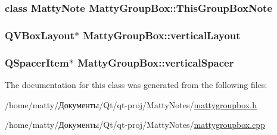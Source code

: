 \subsubsection[{\texorpdfstring{This\+Group\+Box\+Note}{ThisGroupBoxNote}}]{\setlength{\rightskip}{0pt plus 5cm}class {\bf Matty\+Note} Matty\+Group\+Box\+::\+This\+Group\+Box\+Note\hspace{0.3cm}{\ttfamily [private]}}\hypertarget{class_matty_group_box_a00ca2ef39a0b5aca9e83373777bed395}{}\label{class_matty_group_box_a00ca2ef39a0b5aca9e83373777bed395}
\subsubsection[{\texorpdfstring{vertical\+Layout}{verticalLayout}}]{\setlength{\rightskip}{0pt plus 5cm}Q\+V\+Box\+Layout$\ast$ Matty\+Group\+Box\+::vertical\+Layout\hspace{0.3cm}{\ttfamily [private]}}\hypertarget{class_matty_group_box_a2fc280283ef68a61828fe26007c949f1}{}\label{class_matty_group_box_a2fc280283ef68a61828fe26007c949f1}
\subsubsection[{\texorpdfstring{vertical\+Spacer}{verticalSpacer}}]{\setlength{\rightskip}{0pt plus 5cm}Q\+Spacer\+Item$\ast$ Matty\+Group\+Box\+::vertical\+Spacer\hspace{0.3cm}{\ttfamily [private]}}\hypertarget{class_matty_group_box_ae622d8330b00272995af1d41ce037b4c}{}\label{class_matty_group_box_ae622d8330b00272995af1d41ce037b4c}


The documentation for this class was generated from the following files\+:\begin{DoxyCompactItemize}
\item 
/home/matty/Документы/\+Qt/qt-\/proj/\+Matty\+Notes/\hyperlink{mattygroupbox_8h}{mattygroupbox.\+h}\item 
/home/matty/Документы/\+Qt/qt-\/proj/\+Matty\+Notes/\hyperlink{mattygroupbox_8cpp}{mattygroupbox.\+cpp}\end{DoxyCompactItemize}
